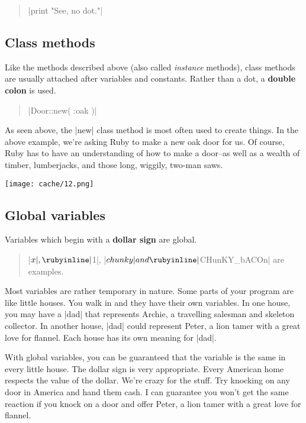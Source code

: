 \documentclass[12pt,twoside]{report}
\begin{document}
\begin{quote}
\rubyinline|print "See, no dot."|\end{quote}




\subsection{Class methods}



Like the methods described above (also called {\em instance} methods),
class methods are usually attached after variables and constants.
Rather than a dot, a {\bf double colon} is used.

\begin{quote}
\rubyinline|Door::new( :oak )|\end{quote}


As seen above, the \rubyinline|new| class method is
most often used to create things.  In the above example, we're asking
Ruby to make a new oak door for us.  Of course, Ruby has to have an
understanding of how to make a door--as well as a wealth of timber,
lumberjacks, and those long, wiggily, two-man saws.

	\texttt{[image: cache/12.png]}




\subsection{Global variables}



Variables which begin with a {\bf dollar sign} are global.

\begin{quote}
\rubyinline|$x|, \rubyinline|$1|,
\rubyinline|$chunky| and
\rubyinline|$CHunKY_bACOn| are examples.\end{quote}


Most variables are rather temporary in nature.  Some parts of your
program are like little houses. You walk in and they have their own
variables.  In one house, you may have a
\rubyinline|dad| that represents Archie, a travelling
salesman and skeleton collector.  In another house,
\rubyinline|dad| could represent Peter, a lion tamer
with a great love for flannel.  Each house has its own meaning for
\rubyinline|dad|.

With global variables, you can be guaranteed that the variable is the
same in every little house. The dollar sign is very appropriate.
Every American home respects the value of the dollar.  We're crazy for
the stuff.  Try knocking on any door in America and hand them cash.  I
can guarantee you won't get the same reaction if you knock on a door
and offer Peter, a lion tamer with a great love for flannel.
\end{document}
